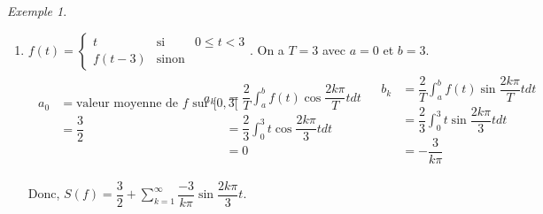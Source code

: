 \documentclass{report}
\newcommand*{\dsum}[4]{\displaystyle\sum_{#1=#2}^{#3}#4}
\newcommand*{\dint}[3]{\displaystyle\int_{#1}^{#2}#3}
\newcommand*{\lte}{\leqslant}
\theoremstyle{definition}
\theoremstyle{remark}
\newtheorem*{exem}{Exemple}
\begin{document}
\begin{exem}
\begin{enumerate}[label=\alph*)]
			Du crit\`ere de Weierstrass, $S(f)$ converge uniform\'ement.
			\item $f(t) = \left\{\begin{array}{rll}
				t&\text{si}&0 \lte t <3\\
				f(t-3)&\text{sinon}
			\end{array}\right.$. On a $T=3$ avec $a=0$ et $b=3$.
			\begin{align*}
				\begin{split}
					a_0&= \text{valeur moyenne de $f$ sur $[0,3[$}\\
					&= \dfrac{3}{2}
				\end{split}
				&
				\begin{split}
					a_k&= \dfrac{2}{T} \dint{a}{b}{f(t) \cos \dfrac{2k\pi}{T}t dt}\\
					&= \dfrac{2}{3} \dint{0}{3}{t \cos\dfrac{2k\pi}{3}t dt}\\
					&= 0
				\end{split}
				&
				\begin{split}
					b_k&= \dfrac{2}{T} \dint{a}{b}{f(t) \sin\dfrac{2k\pi}{T}t dt}\\
					&= \dfrac{2}{3} \dint{0}{3}{t \sin\dfrac{2k\pi}{3}t dt}\\
					&= -\dfrac{3}{k\pi}
				\end{split}
			\end{align*}

			Donc, $S(f) = \dfrac{3}{2} + \dsum{k}{1}{\infty}{\dfrac{-3}{k\pi} \sin\dfrac{2k\pi}{3}t}$.
		\end{enumerate}
	\end{exem}
\end{document}
